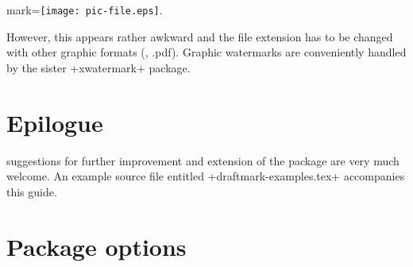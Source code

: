 \documentclass[a4paper,11pt,final]{article}
\begin{document}
\begin{dmverbatim}
  mark={\texttt{[image: pic-file.eps]}}.
\end{dmverbatim}

However, this appears rather awkward and the file extension has to be changed with other graphic formats (\eg, .pdf). Graphic watermarks are conveniently handled by the sister +xwatermark+ package.

\section{Epilogue}
 suggestions for further improvement and extension of the package are very much welcome. An example source file entitled +draftmark-examples.tex+ accompanies this guide.

\appendix
\section{Package options\label{sec:package-options}}
\end{document}
